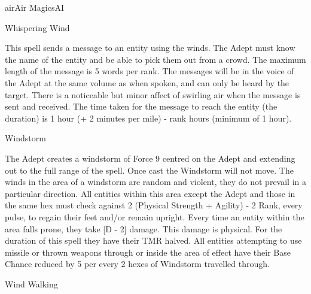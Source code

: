 \begin{college}[2.1]{air}{Air Magics}{AI}
\begin{spell}[S-15]{Whispering Wind}

\begin{effects}
This spell sends a message to an entity using the winds. The Adept
must know the name of the entity and be able to pick them out from a
crowd. The maximum length of the message is 5 words per rank. The
messages will be in the voice of the Adept at the same volume as when
spoken, and can only be heard by the target. There is a noticeable but
minor affect of swirling air when the message is sent and
received. The time taken for the message to reach the entity (the
duration) is 1 hour (+ 2 minutes per mile) - rank hours (minimum of 1
hour).
\end{effects}
\end{spell}

\begin{spell}[S-16]{Windstorm}

\begin{effects}
The Adept creates a windstorm of Force 9 centred on the Adept and
extending out to the full range of the spell. Once cast the Windstorm
will not move. The winds in the area of a windstorm are random and
violent, they do not prevail in a particular direction. All entities
within this area except the Adept and those in the same hex must check
against 2 \x (Physical Strength + Agility) - 2 \x Rank, every pulse,
to regain their feet and/or remain upright. Every time an entity
within the area falls prone, they take [D - 2] damage. This damage is
physical. For the duration of this spell they have their TMR
halved. All entities attempting to use missile or thrown weapons
through or inside the area of effect have their Base Chance reduced by
5 per every 2 hexes of Windstorm travelled through.
\end{effects}
\end{spell}

\begin{spell}[S-17]{Wind Walking}


\end{spell}
\end{college}
